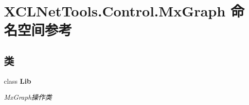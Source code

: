 \hypertarget{namespace_x_c_l_net_tools_1_1_control_1_1_mx_graph}{}\section{X\+C\+L\+Net\+Tools.\+Control.\+Mx\+Graph 命名空间参考}
\label{namespace_x_c_l_net_tools_1_1_control_1_1_mx_graph}
\subsection*{类}
\begin{DoxyCompactItemize}
\item 
class {\bfseries Lib}
\begin{DoxyCompactList}\small\item\em Mx\+Graph操作类 \end{DoxyCompactList}\end{DoxyCompactItemize}
